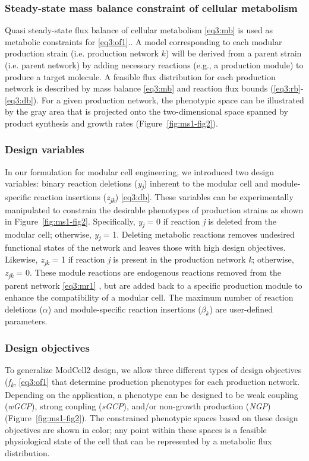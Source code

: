 \subsubsection{Steady-state mass balance constraint of cellular metabolism}
Quasi steady-state flux balance of cellular metabolism \eqref{eq3:mb} is used as metabolic constraints for \eqref{eq3:of1}.\citep{price2003}. A model corresponding to each modular
production strain (i.e. production network $k$) will be derived from a
parent strain (i.e. parent network) by adding necessary reactions (e.g.,
a production module) to produce a target molecule. A feasible flux
distribution for each production network is described by mass balance
\eqref{eq3:mb} and reaction flux bounds (\ref{eq3:rb}-\ref{eq3:db}). For a given
production network, the phenotypic space can be illustrated by the gray
area that is projected onto the two-dimensional space spanned by product
synthesis and growth rates (Figure~\ref{fig:ms1-fig2}).

\subsubsection{Design variables} In our formulation for modular cell
engineering, we introduced two design variables: binary reaction
deletions (\emph{y\textsubscript{j}}) inherent to the modular cell and
module-specific reaction insertions (\emph{z\textsubscript{jk}}) \eqref{eq3:db}.
These variables can be experimentally manipulated to constrain the
desirable phenotypes of production strains as shown in Figure~\ref{fig:ms1-fig2}.
Specifically, \emph{y\textsubscript{j}} = 0 if reaction \emph{j} is
deleted from the modular cell; otherwise, \emph{y\textsubscript{j}} = 1.
Deleting metabolic reactions removes undesired functional states of the
network and leaves those with high design objectives. Likewise,
\emph{z\textsubscript{jk}} = 1 if reaction \emph{j} is present in the
production network \emph{k}; otherwise, \emph{z\textsubscript{jk}} = 0.
These module reactions are endogenous reactions removed from the parent
network \eqref{eq3:mr1} , but are added back to a specific production module to
enhance the compatibility of a modular cell. The maximum number of
reaction deletions ($\alpha$) and module-specific reaction insertions
($\beta_k$) are user-defined parameters.

\subsubsection{Design objectives} To generalize ModCell2 design, we allow
three different types of design objectives (\emph{f\textsubscript{k}},
\eqref{eq3:of1} that determine production phenotypes for each production
network. Depending on the application, a phenotype can be designed to be
weak coupling (\emph{wGCP}), strong coupling (\emph{sGCP}), and/or
non-growth production (\emph{NGP}) (Figure~\ref{fig:ms1-fig2}). The constrained
phenotypic spaces based on these design objectives are shown in color;
any point within these spaces is a feasible physiological state of the
cell that can be represented by a metabolic flux distribution.

